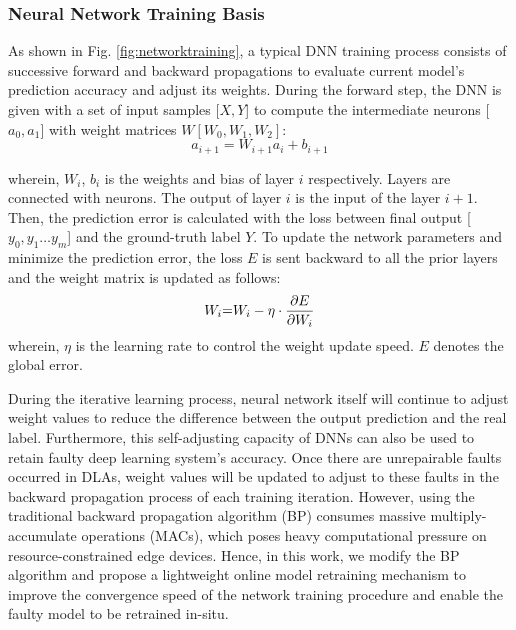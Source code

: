 \subsubsection{Neural Network Training Basis}
As shown in Fig. \ref{fig:networktraining}, a typical DNN training process consists of successive forward and backward propagations to evaluate current model's prediction accuracy and adjust its weights. During the forward step, the DNN is given with a set of input samples [$X,Y$] to compute the intermediate neurons [${a_0},{a_1}$] with weight matrices $W[{W_0},{W_1},{W_2}]$: 
\begin{equation}
    {a_{i + 1}} = {W_{i+1}}{a_i} + {b_{i+1}}
\end{equation}

wherein, $W_i$, $b_i$ is the weights and bias of layer $i$ respectively. Layers are connected with neurons. The output of layer $i$ is the input of the layer $i+1$. Then, the prediction error is calculated with the loss between final output  [${y_0},{y_1} \ldots {y_m}$] and the ground-truth label $Y$. To update the network parameters and minimize the prediction error, the loss $E$ is sent backward to all the prior layers and the weight matrix is updated as follows: 
\begin{equation}
    {W_i}{\rm{ = }} {W_i} - \eta \cdot \frac{{\partial E}}{{\partial {W_i}}}
    \label{eq:backforward}
\end{equation}
wherein, $\eta $ is the learning rate to control the  weight update speed. $E$ denotes the global error.  


During the iterative learning process, neural network itself will continue to adjust weight values to reduce the difference between the output prediction and the real label. Furthermore, this self-adjusting capacity of DNNs can also be used to retain faulty deep learning system's accuracy. Once there are unrepairable faults occurred in DLAs, weight values will be updated to adjust to these faults in the backward propagation process of each training iteration. However, using the traditional backward propagation algorithm (BP) consumes massive multiply-accumulate operations (MACs), which poses heavy computational pressure on resource-constrained edge devices. Hence, in this work, we modify the BP algorithm and propose a lightweight online model retraining mechanism to improve the convergence speed of the network training procedure and enable the faulty model to be retrained in-situ.

